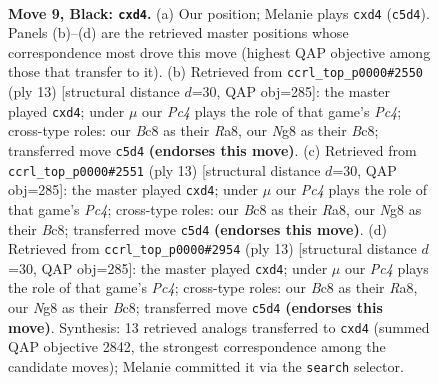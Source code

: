 \documentclass[11pt]{article}
\begin{document}
\clearpage

\begin{figure}[p]\centering
\begin{subfigure}{0.46\textwidth}\centering
\resizebox{\linewidth}{!}{%
\newchessgame
\chessboard[
  setfen={r1b1kbnr/pp3p1p/1qn1p1p1/2ppP3/1P1P2PP/P1P2N2/5P2/RNBQKB1R b KQkq - 0 9},
  showmover=false,
  pgfstyle=straightmove, color=movearrow, markmove={c5-d4}
]}
\caption{}
\end{subfigure}\hfill
\begin{subfigure}{0.46\textwidth}\centering
\resizebox{\linewidth}{!}{%
\newchessgame
\chessboard[
  setfen={r1b1kb1r/pp3ppp/1qn1p2n/2ppP3/1P1P4/P1P2N2/5PPP/RNBQKB1R b KQkq - 0 7},
  showmover=false,
  pgfstyle=straightmove, color=movearrow, markmove={c5-d4}
]}
\caption{}
\end{subfigure}
\\[4pt]
\begin{subfigure}{0.46\textwidth}\centering
\resizebox{\linewidth}{!}{%
\newchessgame
\chessboard[
  setfen={r1b1kb1r/pp3ppp/1qn1p2n/2ppP3/1P1P4/P1P2N2/5PPP/RNBQKB1R b KQkq - 0 7},
  showmover=false,
  pgfstyle=straightmove, color=movearrow, markmove={c5-d4}
]}
\caption{}
\end{subfigure}\hfill
\begin{subfigure}{0.46\textwidth}\centering
\resizebox{\linewidth}{!}{%
\newchessgame
\chessboard[
  setfen={r1b1kb1r/pp3ppp/1qn1p2n/2ppP3/1P1P4/P1P2N2/5PPP/RNBQKB1R b KQkq - 0 7},
  showmover=false,
  pgfstyle=straightmove, color=movearrow, markmove={c5-d4}
]}
\caption{}
\end{subfigure}
\caption{\textbf{Move 9, Black: \texttt{cxd4}.} (a) Our position; Melanie plays \texttt{cxd4} (\texttt{c5d4}). Panels (b)--(d) are the retrieved master positions whose correspondence most drove this move (highest QAP objective among those that transfer to it). (b) Retrieved from \texttt{ccrl\_top\_p0000\#2550} (ply 13) [structural distance $d$=30, QAP obj=285]: the master played \texttt{cxd4}; under $\mu$ our \emph{Pc4} plays the role of that game's \emph{Pc4}; cross-type roles: our \emph{B}c8 as their \emph{R}a8, our \emph{N}g8 as their \emph{B}c8; transferred move \texttt{c5d4} \textbf{(endorses this move)}. (c) Retrieved from \texttt{ccrl\_top\_p0000\#2551} (ply 13) [structural distance $d$=30, QAP obj=285]: the master played \texttt{cxd4}; under $\mu$ our \emph{Pc4} plays the role of that game's \emph{Pc4}; cross-type roles: our \emph{B}c8 as their \emph{R}a8, our \emph{N}g8 as their \emph{B}c8; transferred move \texttt{c5d4} \textbf{(endorses this move)}. (d) Retrieved from \texttt{ccrl\_top\_p0000\#2954} (ply 13) [structural distance $d$=30, QAP obj=285]: the master played \texttt{cxd4}; under $\mu$ our \emph{Pc4} plays the role of that game's \emph{Pc4}; cross-type roles: our \emph{B}c8 as their \emph{R}a8, our \emph{N}g8 as their \emph{B}c8; transferred move \texttt{c5d4} \textbf{(endorses this move)}. Synthesis: 13 retrieved analogs transferred to \texttt{cxd4} (summed QAP objective 2842, the strongest correspondence among the candidate moves); Melanie committed it via the \texttt{search} selector.}
\label{fig:thought-m17}
\end{figure}
\end{document}

